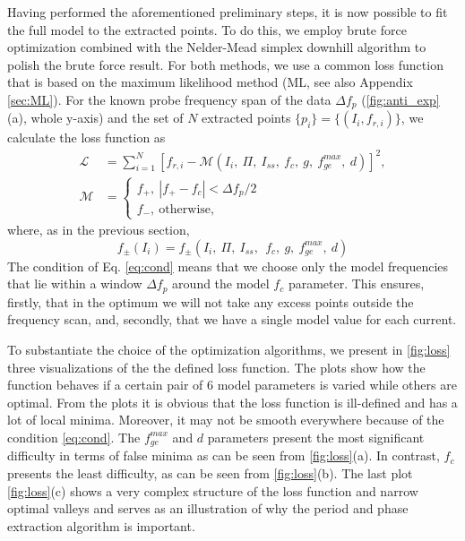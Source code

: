 \documentclass[%
 aip,
 draft,
 amsmath,amssymb,
 reprint,%
]{revtex4-1}
\begin{document}
Having performed the aforementioned preliminary steps, it is now possible to fit the full model to the extracted points. To do this, we employ brute force optimization combined with the Nelder-Mead simplex downhill algorithm\cite{nelder1965} to polish the brute force result. For both methods, we use a common loss function that is based on the maximum likelihood method\cite{bishop2006} (ML, see also Appendix \ref{sec:ML}). 
For the known probe frequency span of the data $\Delta f_p$ (\autoref{fig:anti_exp}(a), whole y-axis) and the set of $N$ extracted points $\{p_i\} = \{(I_i, f_{r,i})\}$, we calculate the loss function as
\begin{align}
\mathcal{L} &= \sum_{i=1}^N [f_{r,i} - \mathcal{M}(I_i,\ \Pi, \ I_{ss},\ f_c,\ g,\ f_{ge}^{max},\ d)]^2,\label{eq:loss}\\
\mathcal{M} &= \begin{cases}
f_+,\  |f_+ - f_c|< \Delta f_p/2 \\
f_-,\ \text{otherwise}, \label{eq:cond}
\end{cases}
\end{align}
where, as in the previous section, $$f_{\pm}(I_i) = f_{\pm}(I_i,\ \Pi,\ I_{ss},\ \ f_c,\ g,\ f_{ge}^{max},\ d)$$
The condition of Eq. \eqref{eq:cond} means that we choose only the model frequencies that lie within a window $\Delta f_p$ around the model $f_c$ parameter. This ensures, firstly, that in the optimum we will not take any excess points outside the frequency scan, and, secondly, that we have a single model value for each current.

To substantiate the choice of the optimization algorithms, we present in \autoref{fig:loss} three visualizations of the the defined loss function. The plots show how the function behaves if a certain pair of 6 model parameters is varied while others are optimal. From the plots it is obvious that the loss function is ill-defined and has a lot of local minima. Moreover, it may not be smooth everywhere because of the condition \eqref{eq:cond}. The $f^{max}_{ge}$ and $d$ parameters present the most significant difficulty in terms of false minima as can be seen from \autoref{fig:loss}(a). In contrast, $f_c$ presents the least difficulty, as can be seen from \autoref{fig:loss}(b). The last plot \autoref{fig:loss}(c) shows a very complex structure of the loss function and narrow optimal valleys and serves as an illustration of why the period and phase extraction algorithm is important.
\end{document}
